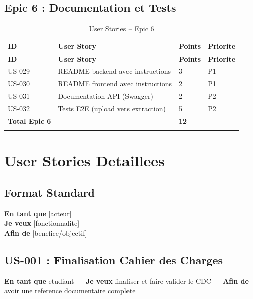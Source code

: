﻿\documentclass[12pt,a4paper]{report}
\begin{document}
\section{Epic 6 : Documentation et Tests}

\begin{longtable}{|p{1.5cm}|p{7cm}|p{2cm}|p{2cm}|}
\hline
\rowcolor{bleu3S!20}
\textbf{ID} & \textbf{User Story} & \textbf{Points} & \textbf{Priorite} \\
\hline
\endfirsthead
\hline \rowcolor{bleu3S!20} \textbf{ID} & \textbf{User Story} & \textbf{Points} & \textbf{Priorite} \\ \hline
\endhead
US-029 & README backend avec instructions & 3 & P1 \\ \hline
US-030 & README frontend avec instructions & 2 & P1 \\ \hline
US-031 & Documentation API (Swagger) & 2 & P2 \\ \hline
US-032 & Tests E2E (upload vers extraction) & 5 & P2 \\ \hline
\rowcolor{grisleger} \textbf{Total Epic 6} & & \textbf{12} & \\ \hline
\caption{User Stories -- Epic 6}
\end{longtable}

\chapter{User Stories Detaillees}

\section{Format Standard}

\begin{mdframed}[backgroundcolor=grisleger!50,linecolor=bleu3S,linewidth=1pt]
\textbf{En tant que} [acteur] \\
\textbf{Je veux} [fonctionnalite] \\
\textbf{Afin de} [benefice/objectif]
\end{mdframed}

\section{US-001 : Finalisation Cahier des Charges}

\textbf{En tant que} etudiant ---
\textbf{Je veux} finaliser et faire valider le CDC ---
\textbf{Afin de} avoir une reference documentaire complete
\end{document}
